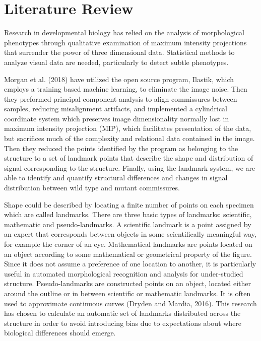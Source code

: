\documentclass[10pt,letterpaper]{article}
\begin{document}
\section{Literature Review}\label{literature-review}

Research in developmental biology has relied on the analysis of
morphological phenotypes through qualitative examination of maximum
intensity projections that surrender the power of three dimensional
data. Statistical methods to analyze visual data are needed,
particularly to detect subtle phenotypes.

Morgan et al. (2018) have utilized the open source program, Ilastik,
which employs a training based machine learning, to eliminate the image
noise. Then they preformed principal component analysis to align
commissures between samples, reducing misalignment artifacts, and
implemented a cylindrical coordinate system which preserves image
dimensionality normally lost in maximum intensity projection (MIP),
which facilitates presentation of the data, but sacrifices much of the
complexity and relational data contained in the image. Then they reduced
the points identified by the program as belonging to the structure to a
set of landmark points that describe the shape and distribution of
signal corresponding to the structure. Finally, using the landmark
system, we are able to identify and quantify structural differences and
changes in signal distribution between wild type and mutant commissures.

Shape could be described by locating a finite number of points on each
specimen which are called landmarks. There are three basic types of
landmarks: scientific, mathematic and pseudo-landmarks. A scientific
landmark is a point assigned by an expert that corresponds between
objects in some scientifically meaningful way, for example the corner of
an eye. Mathematical landmarks are points located on an object according
to some mathematical or geometrical property of the figure. Since it
does not assume a preference of one location to another, it is
particularly useful in automated morphological recognition and analysis
for under-studied structure. Pseudo-landmarks are constructed points on
an object, located either around the outline or in between scientific or
mathematic landmarks. It is often used to approximate continuous curves
(Dryden and Mardia, 2016). This research has chosen to calculate an
automatic set of landmarks distributed across the structure in order to
avoid introducing bias due to expectations about where biological
differences should emerge.
\end{document}
